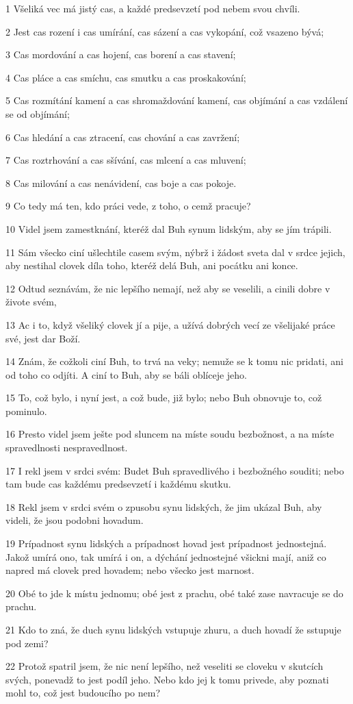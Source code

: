 \par 1 Všeliká vec má jistý cas, a každé predsevzetí pod nebem svou chvíli.
\par 2 Jest cas rození i cas umírání, cas sázení a cas vykopání, což vsazeno bývá;
\par 3 Cas mordování a cas hojení, cas borení a cas stavení;
\par 4 Cas pláce a cas smíchu, cas smutku a cas proskakování;
\par 5 Cas rozmítání kamení a cas shromaždování kamení, cas objímání a cas vzdálení se od objímání;
\par 6 Cas hledání a cas ztracení, cas chování a cas zavržení;
\par 7 Cas roztrhování a cas sšívání, cas mlcení a cas mluvení;
\par 8 Cas milování a cas nenávidení, cas boje a cas pokoje.
\par 9 Co tedy má ten, kdo práci vede, z toho, o cemž pracuje?
\par 10 Videl jsem zamestknání, kteréž dal Buh synum lidským, aby se jím trápili.
\par 11 Sám všecko ciní ušlechtile casem svým, nýbrž i žádost sveta dal v srdce jejich, aby nestihal clovek díla toho, kteréž delá Buh, ani pocátku ani konce.
\par 12 Odtud seznávám, že nic lepšího nemají, než aby se veselili, a cinili dobre v živote svém,
\par 13 Ac i to, když všeliký clovek jí a pije, a užívá dobrých vecí ze všelijaké práce své, jest dar Boží.
\par 14 Znám, že cožkoli ciní Buh, to trvá na veky; nemuže se k tomu nic pridati, ani od toho co odjíti. A ciní to Buh, aby se báli oblíceje jeho.
\par 15 To, což bylo, i nyní jest, a což bude, již bylo; nebo Buh obnovuje to, což pominulo.
\par 16 Presto videl jsem ješte pod sluncem na míste soudu bezbožnost, a na míste spravedlnosti nespravedlnost.
\par 17 I rekl jsem v srdci svém: Budet Buh spravedlivého i bezbožného souditi; nebo tam bude cas každému predsevzetí i každému skutku.
\par 18 Rekl jsem v srdci svém o zpusobu synu lidských, že jim ukázal Buh, aby videli, že jsou podobni hovadum.
\par 19 Prípadnost synu lidských a prípadnost hovad jest prípadnost jednostejná. Jakož umírá ono, tak umírá i on, a dýchání jednostejné všickni mají, aniž co napred má clovek pred hovadem; nebo všecko jest marnost.
\par 20 Obé to jde k místu jednomu; obé jest z prachu, obé také zase navracuje se do prachu.
\par 21 Kdo to zná, že duch synu lidských vstupuje zhuru, a duch hovadí že sstupuje pod zemi?
\par 22 Protož spatril jsem, že nic není lepšího, než veseliti se cloveku v skutcích svých, ponevadž to jest podíl jeho. Nebo kdo jej k tomu privede, aby poznati mohl to, což jest budoucího po nem?

